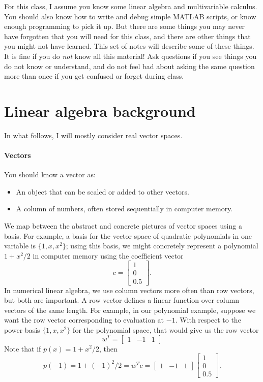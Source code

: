 \documentclass[12pt, leqno]{article}
\begin{document}
\lstset{language=matlab,columns=flexible}

For this class, I assume you know some linear algebra and
multivariable calculus.  You should also know how to write and debug
simple MATLAB scripts, or know enough programming to pick it up.
But there are some things you may never have forgotten that you
will need for this class, and there are other things that you might
not have learned.  This set of notes will describe some of these things.
It is fine if you do {\em not} know all this material!  Ask questions
if you see things you do not know or understand, and do not feel bad
about asking the same question more than once if you get confused or
forget during class.

\section{Linear algebra background}

In what follows, I will mostly consider real vector spaces.

\paragraph{Vectors}
You should know a vector as:
\begin{itemize}
\item An object that can be scaled or added to other vectors.
\item A column of numbers, often stored sequentially
  in computer memory.
\end{itemize}
We map between the abstract and concrete pictures of vector spaces
using a basis.  For example, a basis for the vector space of quadratic
polynomials in one variable is $\{1, x, x^2\}$; using this basis, we
might concretely represent a polynomial $1 + x^2/2$ in computer memory
using the coefficient vector
\[
  c = \begin{bmatrix} 1 \\ 0 \\ 0.5 \end{bmatrix}.
\]
In numerical linear algebra, we use column vectors more often than
row vectors, but both are important.  A row vector defines a linear
function over column vectors of the same length.  For example,
in our polynomial example, suppose we want the row vector
corresponding to evaluation at $-1$.  With respect to the power basis
$\{1, x, x^2\}$ for the polynomial space, that would give us the
row vector
\[
  w^T = \begin{bmatrix} 1 & -1 & 1 \end{bmatrix}
\]
Note that if $p(x) = 1+x^2/2$, then
\[
  p(-1) = 1 + (-1)^2/2
  = w^T c
  = \begin{bmatrix} 1 & -1 & 1 \end{bmatrix}
    \begin{bmatrix} 1 \\ 0 \\ 0.5 \end{bmatrix}.
\]
\end{document}
